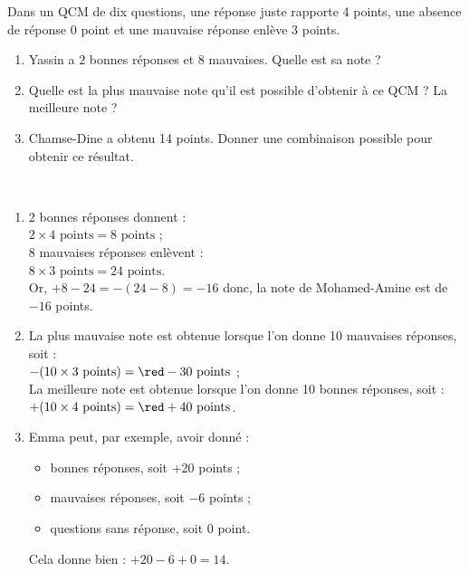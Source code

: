 \begin{exercice*}
   Dans un QCM de dix questions, une réponse juste rapporte 4 points, une absence de réponse 0 point et une mauvaise réponse enlève 3 points.
   \begin{enumerate}
      \item Yassin a 2 bonnes réponses et 8 mauvaises. Quelle est sa note ?
      \item Quelle est la plus mauvaise note qu'il est possible d'obtenir à ce QCM ? La meilleure note ?
      \item Chamse-Dine a obtenu 14 points. Donner une combinaison possible pour obtenir ce résultat.
   \end{enumerate}
\end{exercice*}

\begin{corrige}
   \ \\ [-5mm]
   \begin{enumerate}
      \item 2 bonnes réponses donnent  : \\
         $2\times4\text{ points} =8\text{ points}$ ; \\
         8 mauvaises réponses enlèvent : \\
         $8\times3\text{ points} =24\text{ points}$. \\
         Or, $+8-24 =-(24-8) =-16$ donc, la note de Mohamed-Amine est de {\red $-16$ points}.
      \item La plus mauvaise note est obtenue lorsque l'on donne 10 mauvaises réponses, soit : \\
         $-(10\times3\text{ points}) =\red -30\text{ points}$ ; \\
         La meilleure note est obtenue lorsque l'on donne 10 bonnes réponses, soit  : \\
         $+(10\times4\text{ points}) =\red +40\text{ points}$. \\
      \item Emma peut, par exemple, avoir donné :
         \begin{itemize}
            \item { bonnes réponses}, soit +20 points ;
            \item { mauvaises réponses}, soit $-6$ points ; 
            \item { questions sans réponse}, soit 0 point.
         \end{itemize}
      Cela donne bien : $+20-6+0 =14$.
   \end{enumerate}
\end{corrige}

